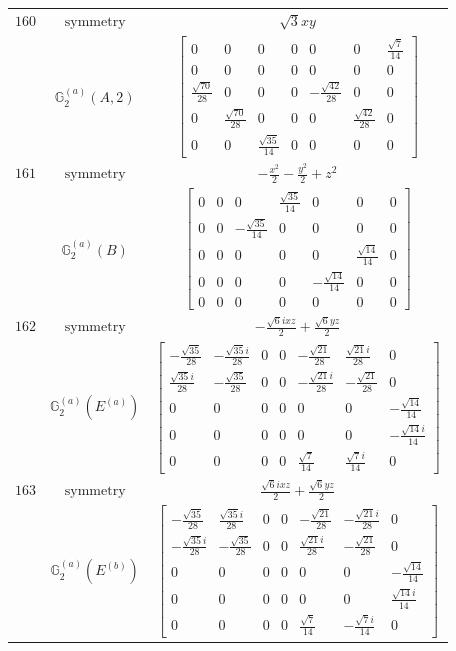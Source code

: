 \documentclass[fleqn,8pt,landscape]{jsarticle}
\begin{document}
\begin{longtable}{ccc}
$ 160 $ & $ \text{symmetry} $ & $ \sqrt{3} x y $ \\
$  $ & $ \mathbb{G}_{2}^{(a)}(A,2) $ & $ \begin{bmatrix} 0 & 0 & 0 & 0 & 0 & 0 & \frac{\sqrt{7}}{14} \\ 0 & 0 & 0 & 0 & 0 & 0 & 0 \\ \frac{\sqrt{70}}{28} & 0 & 0 & 0 & - \frac{\sqrt{42}}{28} & 0 & 0 \\ 0 & \frac{\sqrt{70}}{28} & 0 & 0 & 0 & \frac{\sqrt{42}}{28} & 0 \\ 0 & 0 & \frac{\sqrt{35}}{14} & 0 & 0 & 0 & 0 \end{bmatrix} $ \\ \hline
$ 161 $ & $ \text{symmetry} $ & $ - \frac{x^{2}}{2} - \frac{y^{2}}{2} + z^{2} $ \\
$  $ & $ \mathbb{G}_{2}^{(a)}(B) $ & $ \begin{bmatrix} 0 & 0 & 0 & \frac{\sqrt{35}}{14} & 0 & 0 & 0 \\ 0 & 0 & - \frac{\sqrt{35}}{14} & 0 & 0 & 0 & 0 \\ 0 & 0 & 0 & 0 & 0 & \frac{\sqrt{14}}{14} & 0 \\ 0 & 0 & 0 & 0 & - \frac{\sqrt{14}}{14} & 0 & 0 \\ 0 & 0 & 0 & 0 & 0 & 0 & 0 \end{bmatrix} $ \\ \hline
$ 162 $ & $ \text{symmetry} $ & $ - \frac{\sqrt{6} i x z}{2} + \frac{\sqrt{6} y z}{2} $ \\
$  $ & $ \mathbb{G}_{2}^{(a)}(E^{(a)}) $ & $ \begin{bmatrix} - \frac{\sqrt{35}}{28} & - \frac{\sqrt{35} i}{28} & 0 & 0 & - \frac{\sqrt{21}}{28} & \frac{\sqrt{21} i}{28} & 0 \\ \frac{\sqrt{35} i}{28} & - \frac{\sqrt{35}}{28} & 0 & 0 & - \frac{\sqrt{21} i}{28} & - \frac{\sqrt{21}}{28} & 0 \\ 0 & 0 & 0 & 0 & 0 & 0 & - \frac{\sqrt{14}}{14} \\ 0 & 0 & 0 & 0 & 0 & 0 & - \frac{\sqrt{14} i}{14} \\ 0 & 0 & 0 & 0 & \frac{\sqrt{7}}{14} & \frac{\sqrt{7} i}{14} & 0 \end{bmatrix} $ \\ \hline
$ 163 $ & $ \text{symmetry} $ & $ \frac{\sqrt{6} i x z}{2} + \frac{\sqrt{6} y z}{2} $ \\
$  $ & $ \mathbb{G}_{2}^{(a)}(E^{(b)}) $ & $ \begin{bmatrix} - \frac{\sqrt{35}}{28} & \frac{\sqrt{35} i}{28} & 0 & 0 & - \frac{\sqrt{21}}{28} & - \frac{\sqrt{21} i}{28} & 0 \\ - \frac{\sqrt{35} i}{28} & - \frac{\sqrt{35}}{28} & 0 & 0 & \frac{\sqrt{21} i}{28} & - \frac{\sqrt{21}}{28} & 0 \\ 0 & 0 & 0 & 0 & 0 & 0 & - \frac{\sqrt{14}}{14} \\ 0 & 0 & 0 & 0 & 0 & 0 & \frac{\sqrt{14} i}{14} \\ 0 & 0 & 0 & 0 & \frac{\sqrt{7}}{14} & - \frac{\sqrt{7} i}{14} & 0 \end{bmatrix} $ \\ \hline

\end{longtable}
\end{document}
